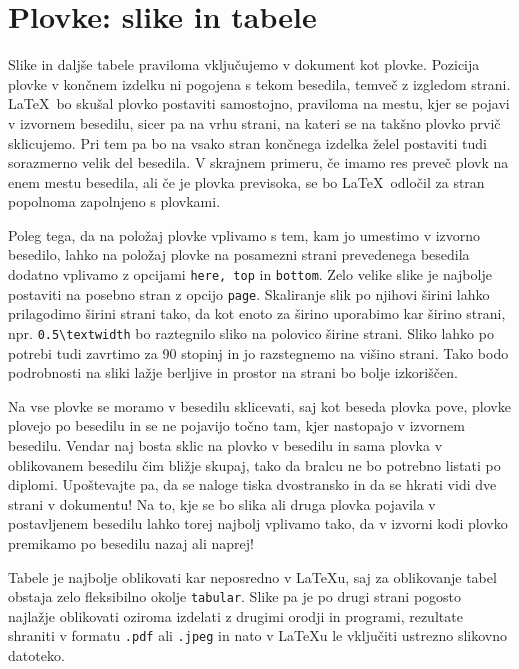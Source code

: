 \documentclass[a4paper,12pt,openright]{book}
\begin{document}
\chapter{Plovke: slike in tabele}
\label{ch2}

Slike in daljše tabele praviloma vključujemo v dokument kot plovke. 
Pozicija plovke v končnem izdelku ni pogojena s tekom besedila, temveč z izgledom strani. 
\LaTeX\ bo skušal plovko postaviti samostojno, praviloma na mestu, kjer se pojavi v izvornem besedilu, sicer pa na 
vrhu strani, na kateri se na takšno plovko prvič sklicujemo. 
Pri tem pa bo na vsako stran končnega izdelka želel postaviti tudi sorazmerno velik del besedila. 
V skrajnem primeru, če imamo res preveč plovk na enem mestu besedila, ali če je plovka previsoka, se bo \LaTeX\ odločil za stran popolnoma zapolnjeno s plovkami.

Poleg tega, da na položaj plovke vplivamo s tem, kam jo umestimo v izvorno besedilo, lahko na položaj plovke na posamezni strani prevedenega besedila dodatno vplivamo z opcijami \texttt{here, top} in \texttt{bottom}.
Zelo velike slike je najbolje postaviti na posebno stran z opcijo \texttt{page}.
Skaliranje slik po njihovi širini lahko prilagodimo širini strani tako, da kot enoto za širino uporabimo kar širino strani, npr. \verb=0.5\textwidth= bo raztegnilo sliko na polovico širine strani.
Sliko lahko po potrebi tudi zavrtimo za 90 stopinj in jo razstegnemo na višino strani. 
Tako bodo podrobnosti na sliki lažje berljive in prostor na strani bo bolje izkoriščen.

Na vse plovke se moramo v besedilu sklicevati, saj kot beseda plovka pove, plovke plovejo po besedilu in se ne pojavijo točno tam, kjer nastopajo v izvornem besedilu.
Vendar naj bosta  sklic na plovko v besedilu in sama plovka v oblikovanem besedilu čim bližje skupaj, tako da bralcu ne bo potrebno listati po diplomi. 
Upoštevajte pa, da se naloge tiska dvostransko in da se hkrati vidi dve strani v dokumentu!
Na to, kje se bo slika ali druga plovka pojavila v postavljenem besedilu lahko torej najbolj vplivamo tako, da v izvorni kodi plovko premikamo po besedilu nazaj ali naprej!

Tabele je najbolje oblikovati kar neposredno v \LaTeX u, saj za oblikovanje tabel obstaja zelo fleksibilno okolje \texttt{tabular}.
Slike pa je po drugi strani  pogosto najla\v zje oblikovati oziroma izdelati z drugimi orodji in programi, rezultate shraniti v formatu {\tt .pdf} ali {\tt .jpeg} in nato v \LaTeX u le vključiti ustrezno slikovno datoteko.
\end{document}
